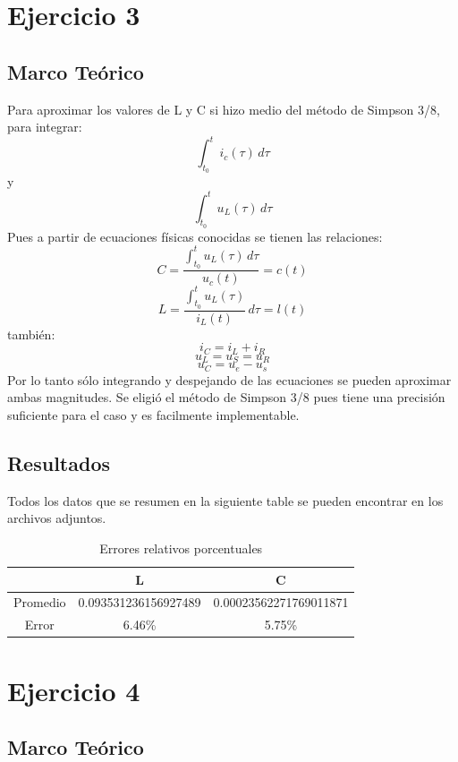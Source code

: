 \documentclass[letterpaper, 10 pt, conference]{ieeeconf}  %
\begin{document}
\section{Ejercicio 3}

\subsection{Marco Te\'orico}
Para aproximar los valores de L y C si hizo medio del m\'etodo de Simpson 3/8, para integrar:
\[ \int_{t_{0}}^{t} i_{c}(\tau) \,d\tau \]
y
\[ \int_{t_{0}}^{t} u_{L}(\tau) \,d\tau \]
Pues a partir de ecuaciones f\'isicas conocidas se tienen las relaciones:
\[ C = \frac{\int_{t_{0}}^{t} u_{L}(\tau) \,d\tau}{u_{c}(t)} = c(t) \]
\[ L = \frac{\int_{t_{0}}^{t} u_{L}(\tau)}{i_{L}(t)} \,d\tau = l(t) \]
tambi\'en:
\[ i_{C} = i_{L} + i_{R} \]
\[ u_{L} = u_{S} = u_{R} \]
\[ u_{C} = u_{e} - u_{s} \]
Por lo tanto s\'olo integrando y despejando de las ecuaciones se pueden aproximar ambas magnitudes.
Se eligi\'o el m\'etodo de Simpson 3/8 pues tiene una precisi\'on suficiente para el caso y es facilmente implementable.

\subsection{Resultados}

Todos los datos que se resumen en la siguiente table se pueden encontrar en los archivos adjuntos.

    \begin{table}[h]
    \begin{center}
    \begin{tabular}{|c||c||c|}
    \hline
    & L &  C \\ 
    \hline
        Promedio & 0.093531236156927489 & 0.00023562271769011871 \\
    \hline
    Error & 6.46\% & 5.75\% \\
    \hline
    \end{tabular}
    \end{center}
    \caption{Errores relativos porcentuales}
    \label{tab:simple}
    \end{table}
    
\section{Ejercicio 4}

\subsection{Marco Te\'orico}
\end{document}
